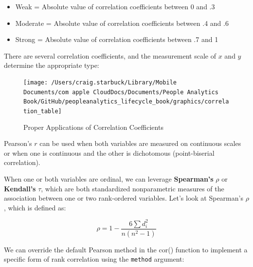 \documentclass[]{book}
\newenvironment{Shaded}{\begin{snugshade}}{\end{snugshade}}
\newcommand{\CommentTok}[1]{\textcolor[rgb]{0.56,0.35,0.01}{\textit{#1}}}
\newcommand{\DataTypeTok}[1]{\textcolor[rgb]{0.13,0.29,0.53}{#1}}
\newcommand{\KeywordTok}[1]{\textcolor[rgb]{0.13,0.29,0.53}{\textbf{#1}}}
\newcommand{\NormalTok}[1]{#1}
\newcommand{\OperatorTok}[1]{\textcolor[rgb]{0.81,0.36,0.00}{\textbf{#1}}}
\newcommand{\StringTok}[1]{\textcolor[rgb]{0.31,0.60,0.02}{#1}}
\providecommand{\tightlist}{%
  \setlength{\itemsep}{0pt}\setlength{\parskip}{0pt}}
\begin{document}
\begin{itemize}
\tightlist
\item
  Weak = Absolute value of correlation coefficients between 0 and .3
\item
  Moderate = Absolute value of correlation coefficients between .4 and .6
\item
  Strong = Absolute value of correlation coefficients between .7 and 1
\end{itemize}

There are several correlation coefficients, and the measurement scale of \(x\) and \(y\) determine the appropriate type:

\begin{figure}

{\centering \texttt{[image: /Users/craig.starbuck/Library/Mobile Documents/com~apple~CloudDocs/Documents/People Analytics Book/GitHub/peopleanalytics\_lifecycle\_book/graphics/correlation\_table]} 

}

\caption{Proper Applications of Correlation Coefficients}\label{fig:corr-table}
\end{figure}

Pearson's \(r\) can be used when both variables are measured on continuous scales or when one is continuous and the other is dichotomous (point-biserial correlation).

When one or both variables are ordinal, we can leverage \textbf{Spearman's} \(\rho\) or \textbf{Kendall's} \(\tau\), which are both standardized nonparametric measures of the association between one or two rank-ordered variables. Let's look at Spearman's \(\rho\), which is defined as:

\[ \rho = 1 - {\frac {6 \sum d_i^2}{n(n^2 - 1)}} \]

We can override the default Pearson method in the cor() function to implement a specific form of rank correlation using the \texttt{method} argument:

\begin{Shaded}
\end{Shaded}
\end{document}
